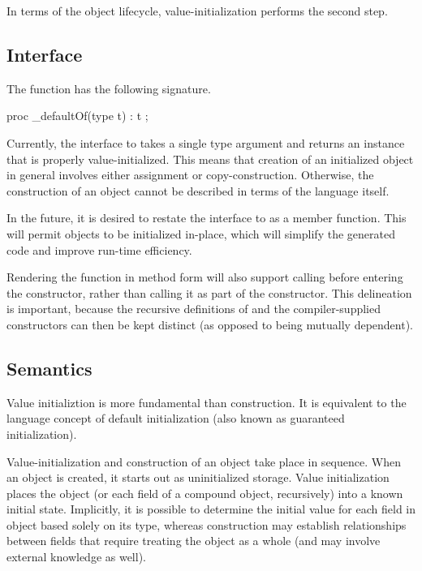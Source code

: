 In terms of the object lifecycle, value-initialization performs the second step.  

\subsection{Interface}

The  function has
the following signature.
\begin{chapel}
proc _defaultOf(type t) : t ;
\end{chapel}

\begin{future}

Currently, the interface to  takes a single type argument and
returns an instance that is properly value-initialized.  This means that
creation of an initialized object in general involves either assignment or
copy-construction.  Otherwise, the construction of an object cannot be described
in terms of the language itself.

In the future, it is desired to restate the interface to  as
a member function.  This will permit objects to be initialized in-place, which
will simplify the generated code and improve run-time efficiency.

Rendering the  function in method form will also support
calling  before entering the constructor, rather than calling
it as part of the constructor.  This delineation is important, because the
recursive definitions of  and the compiler-supplied
constructors can then be kept distinct (as opposed to being mutually dependent).

\end{future}

\subsection{Semantics}

Value initializtion is more fundamental than construction.  It is equivalent to
the language concept of default initialization (also known as guaranteed
initialization).  

Value-initialization and construction of an object take place in sequence.  When
an object is created, it starts out as uninitialized storage.  Value
initialization places the object (or each field of a compound object,
recursively) into a known initial state.  Implicitly, it is possible to
determine the initial value for each field in object based solely on its type, whereas
construction may establish relationships between fields that require treating
the object as a whole (and may involve external knowledge as well).

